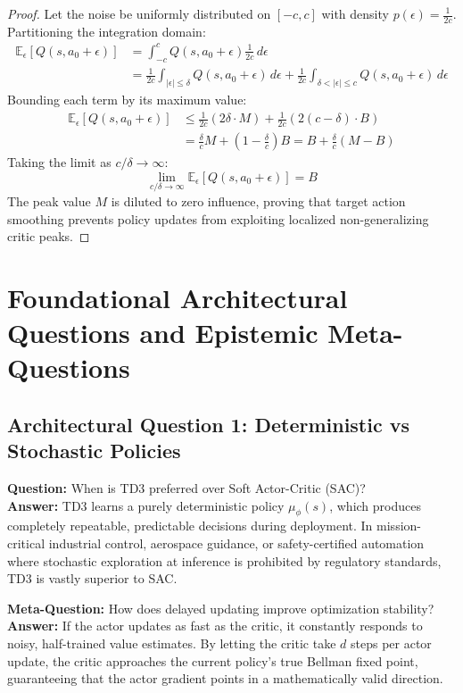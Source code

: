 \documentclass[11pt,a4paper]{article}
\theoremstyle{definition}
\begin{document}
\begin{proof}
Let the noise be uniformly distributed on $[-c, c]$ with density $p(\epsilon) = \frac{1}{2c}$.
Partitioning the integration domain:
{\boldmath
\begin{align}
\mathbb{E}_{\epsilon}[Q(s, a_0 + \epsilon)] &= \int_{-c}^c Q(s, a_0 + \epsilon) \frac{1}{2c} \, d\epsilon \\
&= \frac{1}{2c} \int_{|\epsilon| \le \delta} Q(s, a_0 + \epsilon) \, d\epsilon + \frac{1}{2c} \int_{\delta < |\epsilon| \le c} Q(s, a_0 + \epsilon) \, d\epsilon
\end{align}
}
Bounding each term by its maximum value:
{\boldmath
\begin{align}
\mathbb{E}_{\epsilon}[Q(s, a_0 + \epsilon)] &\le \frac{1}{2c} (2\delta \cdot M) + \frac{1}{2c} (2(c - \delta) \cdot B) \\
&= \frac{\delta}{c} M + \left(1 - \frac{\delta}{c}\right) B = B + \frac{\delta}{c}(M - B)
\end{align}
}
Taking the limit as $c / \delta \to \infty$:
{\boldmath
\begin{equation}
\lim_{c/\delta \to \infty} \mathbb{E}_{\epsilon}[Q(s, a_0 + \epsilon)] = B
\end{equation}
}
The peak value $M$ is diluted to zero influence, proving that target action smoothing prevents policy updates from exploiting localized non-generalizing critic peaks.
\end{proof}

\section{Foundational Architectural Questions and Epistemic Meta-Questions}

\subsection{Architectural Question 1: Deterministic vs Stochastic Policies}
\textbf{Question:} When is TD3 preferred over Soft Actor-Critic (SAC)?\\
\textbf{Answer:} TD3 learns a purely deterministic policy $\mu_\phi(s)$, which produces completely repeatable, predictable decisions during deployment. In mission-critical industrial control, aerospace guidance, or safety-certified automation where stochastic exploration at inference is prohibited by regulatory standards, TD3 is vastly superior to SAC.

\textbf{Meta-Question:} How does delayed updating improve optimization stability?\\
\textbf{Answer:} If the actor updates as fast as the critic, it constantly responds to noisy, half-trained value estimates. By letting the critic take $d$ steps per actor update, the critic approaches the current policy's true Bellman fixed point, guaranteeing that the actor gradient points in a mathematically valid direction.
\end{document}
